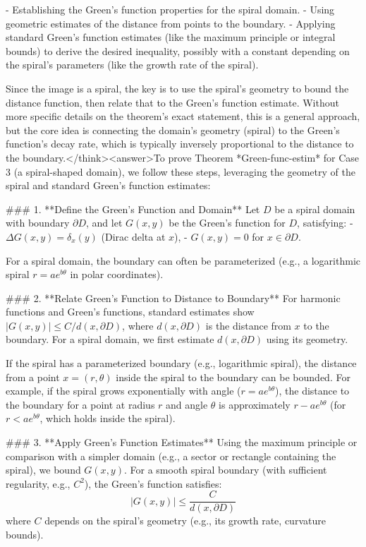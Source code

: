 - Establishing the Green's function properties for the spiral domain.
- Using geometric estimates of the distance from points to the boundary.
- Applying standard Green's function estimates (like the maximum principle or integral bounds) to derive the desired inequality, possibly with a constant depending on the spiral's parameters (like the growth rate of the spiral).

Since the image is a spiral, the key is to use the spiral's geometry to bound the distance function, then relate that to the Green's function estimate. Without more specific details on the theorem's exact statement, this is a general approach, but the core idea is connecting the domain's geometry (spiral) to the Green's function's decay rate, which is typically inversely proportional to the distance to the boundary.</think><answer>To prove Theorem *Green-func-estim* for Case 3 (a spiral-shaped domain), we follow these steps, leveraging the geometry of the spiral and standard Green's function estimates:  


### 1. **Define the Green's Function and Domain**  
Let \( D \) be a spiral domain with boundary \( \partial D \), and let \( G(x, y) \) be the Green's function for \( D \), satisfying:  
- \( \Delta G(x, y) = \delta_x(y) \) (Dirac delta at \( x \)),  
- \( G(x, y) = 0 \) for \( x \in \partial D \).  

For a spiral domain, the boundary can often be parameterized (e.g., a logarithmic spiral \( r = a e^{b\theta} \) in polar coordinates).  


### 2. **Relate Green's Function to Distance to Boundary**  
For harmonic functions and Green's functions, standard estimates show \( |G(x, y)| \leq C / d(x, \partial D) \), where \( d(x, \partial D) \) is the distance from \( x \) to the boundary. For a spiral domain, we first estimate \( d(x, \partial D) \) using its geometry.  

If the spiral has a parameterized boundary (e.g., logarithmic spiral), the distance from a point \( x = (r, \theta) \) inside the spiral to the boundary can be bounded. For example, if the spiral grows exponentially with angle (\( r = a e^{b\theta} \)), the distance to the boundary for a point at radius \( r \) and angle \( \theta \) is approximately \( r - a e^{b\theta} \) (for \( r < a e^{b\theta} \), which holds inside the spiral).  


### 3. **Apply Green's Function Estimates**  
Using the maximum principle or comparison with a simpler domain (e.g., a sector or rectangle containing the spiral), we bound \( G(x, y) \). For a smooth spiral boundary (with sufficient regularity, e.g., \( C^2 \)), the Green's function satisfies:  
\[
|G(x, y)| \leq \frac{C}{d(x, \partial D)}
\]  
where \( C \) depends on the spiral's geometry (e.g., its growth rate, curvature bounds).  

